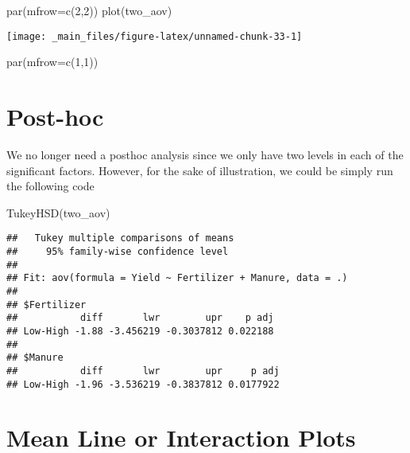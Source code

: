 \documentclass[
]{book}
\newenvironment{Shaded}{\begin{snugshade}}{\end{snugshade}}
\newcommand{\AttributeTok}[1]{\textcolor[rgb]{0.77,0.63,0.00}{#1}}
\newcommand{\DecValTok}[1]{\textcolor[rgb]{0.00,0.00,0.81}{#1}}
\newcommand{\FunctionTok}[1]{\textcolor[rgb]{0.00,0.00,0.00}{#1}}
\newcommand{\NormalTok}[1]{#1}
\begin{document}
\begin{Shaded}
\begin{Highlighting}[]
\FunctionTok{par}\NormalTok{(}\AttributeTok{mfrow=}\FunctionTok{c}\NormalTok{(}\DecValTok{2}\NormalTok{,}\DecValTok{2}\NormalTok{))}
\FunctionTok{plot}\NormalTok{(two\_aov)}
\end{Highlighting}
\end{Shaded}

\begin{center}\texttt{[image: \_main\_files/figure-latex/unnamed-chunk-33-1]} \end{center}

\begin{Shaded}
\begin{Highlighting}[]
\FunctionTok{par}\NormalTok{(}\AttributeTok{mfrow=}\FunctionTok{c}\NormalTok{(}\DecValTok{1}\NormalTok{,}\DecValTok{1}\NormalTok{))}
\end{Highlighting}
\end{Shaded}

\hypertarget{post-hoc-1}{%
\chapter{Post-hoc}\label{post-hoc-1}}

We no longer need a posthoc analysis since we only have two levels in each of the significant factors. However, for the sake of illustration, we could be simply run the following code

\begin{Shaded}
\begin{Highlighting}[]
\FunctionTok{TukeyHSD}\NormalTok{(two\_aov)}
\end{Highlighting}
\end{Shaded}

\begin{verbatim}
##   Tukey multiple comparisons of means
##     95% family-wise confidence level
## 
## Fit: aov(formula = Yield ~ Fertilizer + Manure, data = .)
## 
## $Fertilizer
##           diff       lwr        upr    p adj
## Low-High -1.88 -3.456219 -0.3037812 0.022188
## 
## $Manure
##           diff       lwr        upr     p adj
## Low-High -1.96 -3.536219 -0.3837812 0.0177922
\end{verbatim}

\hypertarget{mean-line-or-interaction-plots}{%
\chapter{Mean Line or Interaction Plots}\label{mean-line-or-interaction-plots}}
\end{document}

